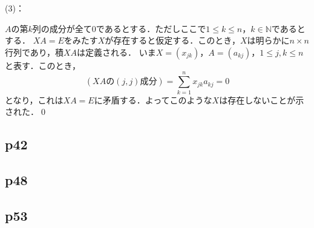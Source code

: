 \documentclass[dvipdfmx,uplatex,11pt]{jsarticle}
\theoremstyle{definition}
\begin{document}
%
    (3)：
    \begin{leftbar}
        $A$の第$k$列の成分が全て$0$であるとする．ただしここで$ 1 \le k \le n$，$ k \in \mathbb{N}$であるとする．
        $XA=E$をみたす$X$が存在すると仮定する．このとき，$X$は明らかに$n \times n$行列であり，積$XA$は定義される．
        いま$X=(x_{jk})$，$A=(a_{kj})$，$ 1 \le j ,k \le n$と表す．このとき，
        \[
           (XA \text{の}(j,j)\text{成分}) = \sum_{k=1}^{n} x_{jk} a_{kj} =0
        \]
        となり，これは$XA =E$に矛盾する．よってこのような$X$は存在しないことが示された．\qed
    \end{leftbar}
%
\newpage
%
%
%
\subsection{p42}
%
%
%
\newpage
%
%
%
\subsection{p48}
%
%
%
\newpage
%
%
%
\subsection{p53}
%
%
%
\newpage
%
%
%
\end{document}
